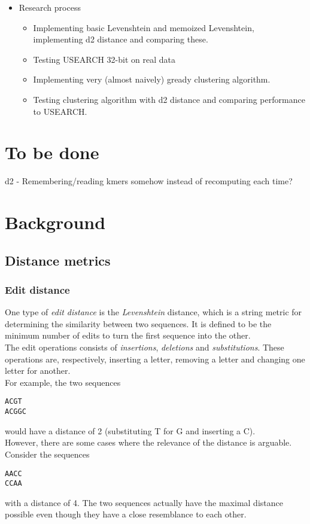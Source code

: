 \documentclass[11pt,a4paper]{article}
\begin{document}
\begin{itemize}
  \item Research process
    \begin{itemize}
      \item Implementing basic Levenshtein and memoized Levenshtein,
        implementing d2 distance and comparing these.
      \item Testing USEARCH 32-bit on real data
      \item Implementing very (almost naively) gready clustering algorithm.
      \item Testing clustering algorithm with d2 distance and comparing
        performance to USEARCH.
    \end{itemize}
\end{itemize}


\section{To be done}
d2 - Remembering/reading kmers somehow instead of recomputing each time?


\section{Background}

\subsection{Distance metrics}

\subsubsection{Edit distance}
One type of \emph{edit distance} is the \emph{Levenshtein} distance, which is a string metric for determining the similarity between two sequences. It is defined to be the minimum number of edits to turn the first sequence into the other. \\
The edit operations consists of \emph{insertions}, \emph{deletions} and \emph{substitutions}. These operations are, respectively, inserting a letter, removing a letter and changing one letter for another. \\
For example, the two sequences
\begin{center}
\texttt{ACGT} \\
\texttt{ACGGC}
\end{center}
would have a distance of 2 (substituting T for G and inserting a C). \\
However, there are some cases where the relevance of the distance is arguable. Consider the sequences
\begin{center}
\texttt{AACC} \\
\texttt{CCAA}
\end{center}
with a distance of 4. The two sequences actually have the maximal distance possible even though they have a close resemblance to each other.
\end{document}
